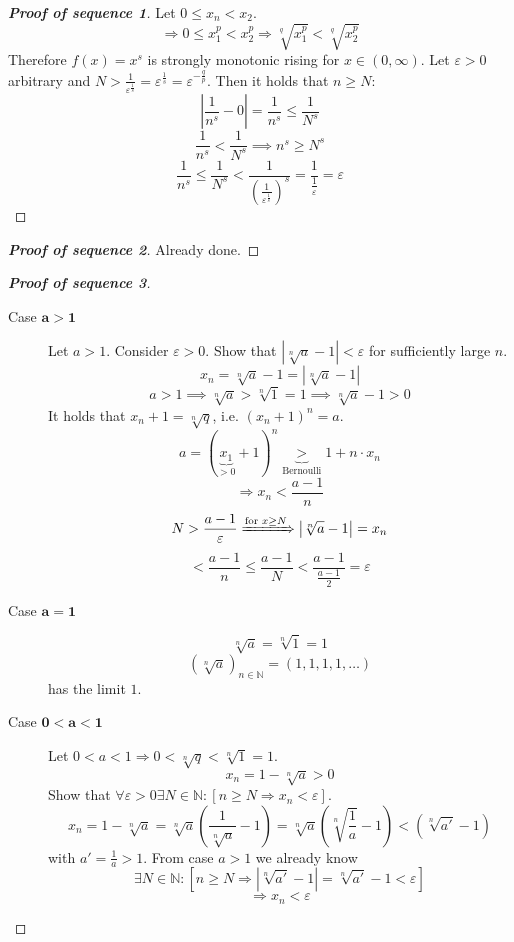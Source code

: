 \documentclass[a4paper,landscape,twocolumn]{article}
\theoremstyle{definition}
\newcommand\abs[1]{\left|#1\right|}
\begin{document}
\begin{proof}[\textbf{Proof of sequence 1}]
  Let $0 \leq x_n < x_2$.
  \[ \Rightarrow 0 \leq x_1^p < x_2^p \Rightarrow \sqrt[q]{x_1^p} < \sqrt[q]{x_2^p} \]
  Therefore $f(x) = x^s$ is strongly monotonic rising for $x \in (0, \infty)$.
  Let $\varepsilon > 0$ arbitrary and $N > \frac1{\varepsilon^{\frac1s}} = \varepsilon^{\frac1s} = \varepsilon^{-\frac qp}$.
  Then it holds that $n \geq N$:
  \[ \abs{\frac1{n^s} - 0} = \frac{1}{n^s} \leq \frac{1}{N^s} \]
  \[ \frac{1}{n^s} < \frac{1}{N^s} \implies n^s \geq N^s \]
  \[
      \frac{1}{n^s} \leq \frac{1}{N^s} < \frac{1}{\left(\frac{1}{\varepsilon^{\frac1s}}\right)^s}
      = \frac{1}{\frac1\varepsilon}
      = \varepsilon
  \]
\end{proof}

\begin{proof}[\textbf{Proof of sequence 2}]
  Already done.
\end{proof}

\begin{proof}[\textbf{Proof of sequence 3}]
  \begin{description}
    \item[Case $\mathbf{a > 1}$]
      Let $a > 1$. Consider $\varepsilon > 0$.
      Show that $\abs{\sqrt[n]{a} - 1} < \varepsilon$ for sufficiently large $n$.
      \[ x_n = \sqrt[n]{a} - 1 = \abs{\sqrt[n]{a} - 1} \]
      \[ a > 1 \implies \sqrt[n]{a} > \sqrt[n]{1} = 1 \implies \sqrt[n]{a} - 1 > 0 \]
      It holds that $x_n + 1 = \sqrt[n]{q}$, i.e. $(x_n + 1)^n = a$.
      \[ a = (\underbrace{x_1}_{> 0} + 1)^n \underbrace{>}_{\text{Bernoulli}} 1 + n \cdot x_n \]
      \[ \Rightarrow x_n < \frac{a - 1}{n} \]
      \[ N > \frac{a - 1}{\varepsilon} \xRightarrow{\text{for } x \geq N} \abs{\sqrt[n]{a} - 1} = x_n \]
      \[ < \frac{a - 1}{n} \leq \frac{a - 1}{N} < \frac{a - 1}{\frac{a - 1}{2}} = \varepsilon \]
    \item[Case $\mathbf{a = 1}$]
      \[ \sqrt[n]{a} = \sqrt[n]{1} = 1 \]
      \[ \left(\sqrt[n]{a}\right)_{n \in \mathbb N} = (1, 1, 1, 1, \dots) \]
      has the limit $1$.
    \item[Case $\mathbf{0 < a < 1}$]
      Let $0 < a < 1 \Rightarrow 0 < \sqrt[n]{q} < \sqrt[n]{1} = 1$.
      \[ x_n = 1 - \sqrt[n]{a} > 0 \]
      Show that $\forall \varepsilon > 0 \exists N \in \mathbb N: \left[n \geq N \Rightarrow x_n < \varepsilon\right]$.
      \[
          x_n
          = 1 - \sqrt[n]{a} = \sqrt[n]{a} \left(\frac{1}{\sqrt[n]{a}} - 1\right)
          = \sqrt[n]{a} \left(\sqrt[n]{\frac1a} - 1\right) < \left(\sqrt[n]{a'} - 1\right)
      \]
      with $a' = \frac1a > 1$.
      From case $a > 1$ we already know
      \[ \exists N \in \mathbb N: \left[n \geq N \Rightarrow \abs{\sqrt[n]{a'} - 1} = \sqrt[n]{a'} - 1 < \varepsilon\right] \]
      \[ \Rightarrow x_n < \varepsilon \]
  \end{description}
\end{proof}
\end{document}
